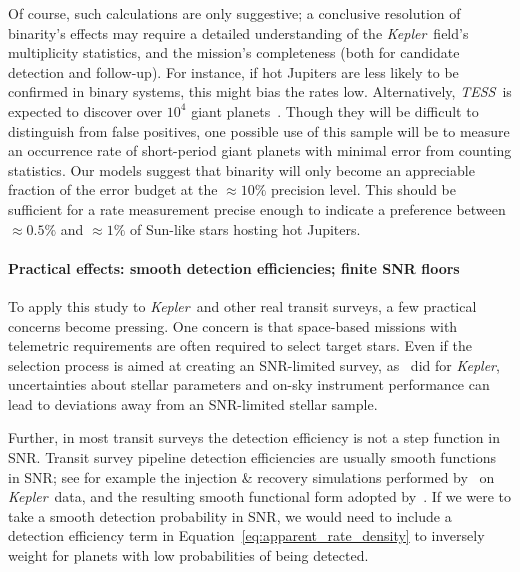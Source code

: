 \documentclass[12pt,modern]{aastex61}
\begin{document}
Of course, such calculations are only suggestive; a conclusive resolution 
of binarity's effects may require a detailed understanding of the 
{\it Kepler}\ field's multiplicity statistics, and the mission's completeness 
(both for candidate detection and follow-up).
For instance, if hot Jupiters are less likely to be confirmed in binary 
systems, this might bias the rates low.
Alternatively, {\it TESS}\ is expected to discover over $10^4$ 
giant planets~\citep{ricker_transiting_2014,sullivan_transiting_2015}.
Though they will be difficult to distinguish from false positives, one 
possible use of this sample will be to measure an occurrence rate of 
short-period giant planets with minimal error from counting statistics.
Our models suggest that binarity will only become an appreciable fraction of 
the error budget at the $\approx 10\%$ precision level.
This should be sufficient for a rate measurement precise enough to indicate a 
preference between $\approx 0.5\%$ and $\approx 1\%$ of Sun-like stars hosting 
hot Jupiters.



\paragraph{Practical effects: smooth detection efficiencies; finite SNR floors}
To apply this study to {\it Kepler}\ and other real
transit surveys, a few practical concerns become pressing.
One concern is that space-based missions with telemetric requirements
are often required to select target stars.
Even if the selection process is aimed at creating an SNR-limited
survey, as~\citet{batalha_selection_2010} did for {\it Kepler},
uncertainties about stellar parameters and on-sky instrument performance
can lead to deviations away from an SNR-limited stellar sample.

Further, in most transit surveys the detection efficiency is not
a step function in SNR.
Transit survey pipeline detection efficiencies are usually smooth
functions in SNR; see for example the injection \& recovery 
simulations 
performed by~\citet{christiansen_measuring_2016} on {\it Kepler}\ data, 
and the resulting smooth functional form adopted 
by~\citet{fulton_california-_2017}.
If we were to take a smooth detection probability in SNR, we would need to 
include a detection efficiency term in 
Equation~\ref{eq:apparent_rate_density} to inversely weight for planets 
with low probabilities of being detected.
\end{document}
